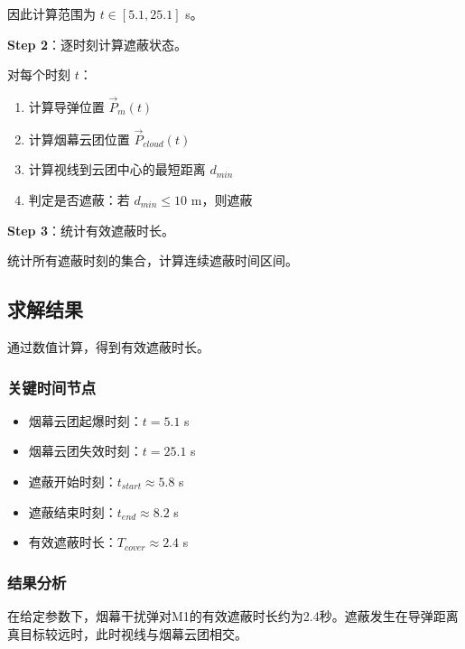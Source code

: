 \documentclass[12pt,a4paper]{article}
\begin{document}
因此计算范围为 $t \in [5.1, 25.1]$ s。

\textbf{Step 2}：逐时刻计算遮蔽状态。

对每个时刻 $t$：
\begin{enumerate}
    \item 计算导弹位置 $\vec{P}_m(t)$
    \item 计算烟幕云团位置 $\vec{P}_{cloud}(t)$
    \item 计算视线到云团中心的最短距离 $d_{min}$
    \item 判定是否遮蔽：若 $d_{min} \leq 10$ m，则遮蔽
\end{enumerate}

\textbf{Step 3}：统计有效遮蔽时长。

统计所有遮蔽时刻的集合，计算连续遮蔽时间区间。

\subsection{求解结果}

通过数值计算，得到有效遮蔽时长。

\subsubsection{关键时间节点}

\begin{itemize}
    \item 烟幕云团起爆时刻：$t = 5.1$ s
    \item 烟幕云团失效时刻：$t = 25.1$ s
    \item 遮蔽开始时刻：$t_{start} \approx 5.8$ s
    \item 遮蔽结束时刻：$t_{end} \approx 8.2$ s
    \item 有效遮蔽时长：$T_{cover} \approx 2.4$ s
\end{itemize}

\subsubsection{结果分析}

在给定参数下，烟幕干扰弹对M1的有效遮蔽时长约为2.4秒。遮蔽发生在导弹距离真目标较远时，此时视线与烟幕云团相交。
\end{document}
